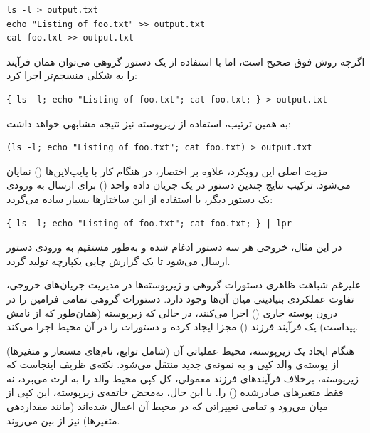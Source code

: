 \begin{latin}
\begin{lstlisting}
ls -l > output.txt
echo "Listing of foo.txt" >> output.txt
cat foo.txt >> output.txt
\end{lstlisting}
\end{latin}

اگرچه روش فوق صحیح است، اما با استفاده از یک دستور گروهی می‌توان همان فرآیند را به شکلی منسجم‌تر اجرا کرد:

\begin{latin}
\begin{lstlisting}
{ ls -l; echo "Listing of foo.txt"; cat foo.txt; } > output.txt
\end{lstlisting}
\end{latin}

به همین ترتیب، استفاده از زیرپوسته نیز نتیجه مشابهی خواهد داشت:

\begin{latin}
\begin{lstlisting}
(ls -l; echo "Listing of foo.txt"; cat foo.txt) > output.txt
\end{lstlisting}
\end{latin}

مزیت اصلی این رویکرد، علاوه بر اختصار، در هنگام کار با پایپ‌لاین‌ها () نمایان می‌شود. ترکیب نتایج چندین دستور در یک جریان داده واحد () برای ارسال به ورودی یک دستور دیگر، با استفاده از این ساختارها بسیار ساده می‌گردد:

\begin{latin}
\begin{lstlisting}
{ ls -l; echo "Listing of foo.txt"; cat foo.txt; } | lpr
\end{lstlisting}
\end{latin}

در این مثال، خروجی هر سه دستور ادغام شده و به‌طور مستقیم به ورودی دستور  ارسال می‌شود تا یک گزارش چاپی یکپارچه تولید گردد.

علیرغم شباهت ظاهری دستورات گروهی و زیرپوسته‌ها در مدیریت جریان‌های خروجی، تفاوت عملکردی بنیادینی میان آن‌ها وجود دارد. دستورات گروهی تمامی فرامین را در درون پوسته جاری () اجرا می‌کنند، در حالی که زیرپوسته (همان‌طور که از نامش پیداست) یک فرآیند فرزند () مجزا ایجاد کرده و دستورات را در آن محیط اجرا می‌کند.

هنگام ایجاد یک زیرپوسته، محیط عملیاتی آن (شامل توابع، نام‌های مستعار و متغیرها) از پوسته‌ی والد کپی و به نمونه‌ی جدید منتقل می‌شود. نکته‌ی ظریف اینجاست که زیرپوسته، برخلاف فرآیندهای فرزند معمولی، کل کپی محیط والد را به ارث می‌برد، نه فقط متغیرهای صادرشده () را. با این حال، به‌محض خاتمه‌ی زیرپوسته، این کپی از میان می‌رود و تمامی تغییراتی که در محیط آن اعمال شده‌اند (مانند مقداردهی متغیرها) نیز از بین می‌روند.

